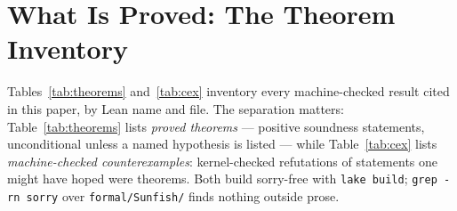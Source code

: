 \documentclass[11pt]{article}
\theoremstyle{plain}
\theoremstyle{definition}
\theoremstyle{remark}
\begin{document}
\section{What Is Proved: The Theorem Inventory}
\label{sec:inventory}

Tables~\ref{tab:theorems} and~\ref{tab:cex} inventory every
machine-checked result cited in this paper, by Lean name and file.  The
separation matters: Table~\ref{tab:theorems} lists \emph{proved
theorems} --- positive soundness statements, unconditional unless a
named hypothesis is listed --- while Table~\ref{tab:cex} lists
\emph{machine-checked counterexamples}: kernel-checked refutations of
statements one might have hoped were theorems.  Both build sorry-free
with \texttt{lake build}; \texttt{grep -rn sorry} over
\texttt{formal/Sunfish/} finds nothing outside prose.
\end{document}
